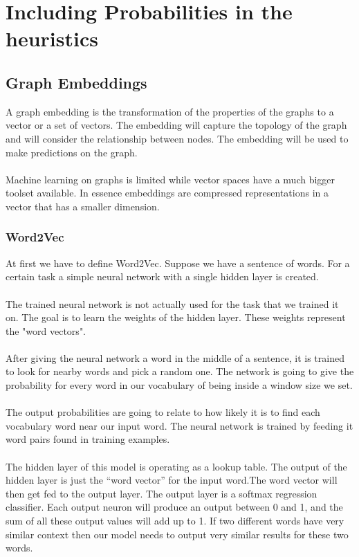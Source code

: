 \chapter{Including Probabilities in the heuristics}		
 \label{sec:prob}		

\section{Graph Embeddings}		
\label{sec:embeddings}		

A graph embedding is the transformation of the properties of the graphs to a vector or a set of vectors. The embedding will capture the topology of the graph and will consider the relationship between nodes. The embedding will be used to make predictions on the graph.
\\
\\
Machine learning on graphs is limited while vector spaces have a much bigger toolset available. In essence embeddings are compressed representations in a vector that has a smaller dimension.		

\subsection{Word2Vec}		

At first we have to define Word2Vec. Suppose we have a sentence of words. For a certain task a simple neural network with a single hidden layer is created. 
\\
\\
The trained neural network is not actually used for the task that we trained it on. The goal is to learn the weights of the hidden layer. These weights represent the "word vectors".		
\\
\\
\noindent After giving the neural network a word in the middle of a sentence, it is trained to look for nearby words and pick a random one. The network is going to give the probability for every word in our vocabulary of being inside a window size we set.	
\\		
\\		
The output probabilities are going to relate to how likely it is to find each vocabulary word near our input word. The neural network is trained by feeding it word pairs found in training examples.		
\\
\\
The hidden layer of this model is operating as a lookup table. The output of the hidden layer is just the “word vector” for the input word.The word vector will then get fed to the output layer. The output layer is a softmax regression classifier. Each output neuron will produce an output between 0 and 1, and the sum of all these output values will add up to 1.
 If two different words have very similar context then our model needs to output very similar results for these two words.		
 

